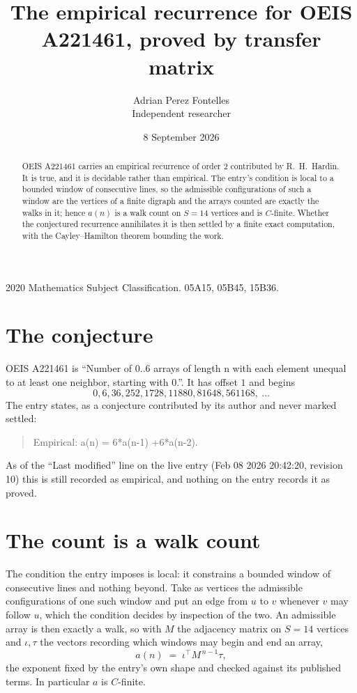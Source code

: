 \documentclass[11pt,a4paper]{article}
\title{The empirical recurrence for OEIS A221461, proved by transfer matrix}
\author{Adrian Perez Fontelles\\ \small Independent researcher}
\date{8 September 2026}
\theoremstyle{plain}
\theoremstyle{definition}
\begin{document}
\maketitle

\begin{abstract}
OEIS A221461 carries an empirical recurrence of order $2$ contributed by R.~H.~Hardin. It is
true, and it is decidable rather than empirical. The entry's condition is local to a bounded window of consecutive lines, so
the admissible configurations of such a window are the vertices of a finite digraph and the
arrays counted are exactly the walks in it; hence $a(n)$ is a walk count on $S=14$ vertices
and is $C$-finite. Whether the conjectured recurrence annihilates it is then settled by a
finite exact computation, with the Cayley--Hamilton theorem bounding the work.
\end{abstract}

\noindent\small 2020 Mathematics Subject Classification. 05A15, 05B45, 15B36.\normalsize

\section{The conjecture}

OEIS A221461 is ``Number of 0..6 arrays of length n with each element unequal to at least one neighbor, starting with 0.''. It has offset $1$ and begins
\[
0, 6, 36, 252, 1728, 11880, 81648, 561168,\ \dots
\]
The entry states, as a conjecture contributed by its author and never marked settled:
\begin{quote}
Empirical: a(n) = 6*a(n-1) +6*a(n-2).
\end{quote}
As of the ``Last modified'' line on the live entry (Feb 08 2026 20:42:20, revision 10) this is still
recorded as empirical, and nothing on the entry records it as proved.

\section{The count is a walk count}

The condition the entry imposes is local: it constrains a bounded window of consecutive lines and nothing beyond. Take as
vertices the admissible configurations of one such window and put an edge from $u$ to $v$
whenever $v$ may follow $u$, which the condition decides by inspection of the two. An
admissible array is then exactly a walk, so with $M$ the adjacency matrix on $S=14$ vertices
and $\iota,\tau$ the vectors recording which windows may begin and end an array,
\[
a(n)\;=\;\iota^{\!\top}M^{\,n-1}\tau ,
\]
the exponent fixed by the entry's own shape and checked against its published terms. In
particular $a$ is $C$-finite.
\end{document}
